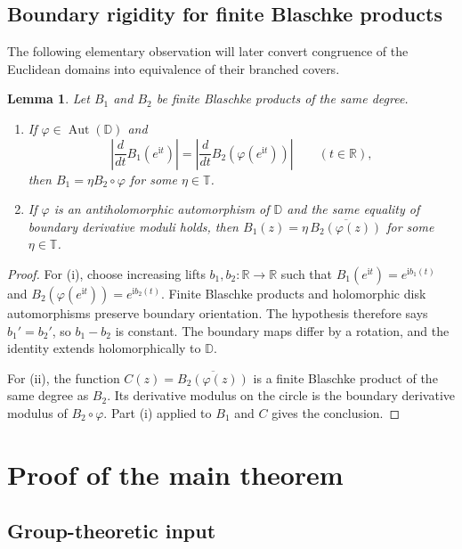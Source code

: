 \documentclass[11pt,letterpaper,reqno]{amsart}
\newtheorem{lemma}[lemma]{Lemma}
\theoremstyle{definition}
\newcommand{\D}{\mathbb D}
\newcommand{\T}{\mathbb T}
\newcommand{\R}{\mathbb R}
\newcommand{\Aut}{\operatorname{Aut}}
\newcommand{\iu}{\mathrm{i}}
\begin{document}
\subsection{Boundary rigidity for finite Blaschke products}

The following elementary observation will later convert congruence of
the Euclidean domains into equivalence of their branched covers.

\begin{lemma}
\label{lem:blaschke-boundary-rigidity}
Let $B_1$ and $B_2$ be finite Blaschke products of the same degree.
\begin{enumerate}[label=\textup{(\roman*)}]
\item If $\varphi\in\Aut(\D)$ and
\[
\left|\frac{d}{dt}B_1(e^{\iu t})\right|
=
\left|\frac{d}{dt}B_2(\varphi(e^{\iu t}))\right|
\qquad(t\in\R),
\]
then $B_1=\eta B_2\circ\varphi$ for some $\eta\in\T$.
\item If $\varphi$ is an antiholomorphic automorphism of $\D$ and the
same equality of boundary derivative moduli holds, then $B_1(z)=\eta\,\overline{B_2(\varphi(z))}$ for some $\eta\in\T$.
\end{enumerate}
\end{lemma}

\begin{proof}
For \textup{(i)}, choose increasing lifts $b_1,b_2:\R\to\R$ such that
$B_1(e^{\iu t})=e^{\iu b_1(t)}$ and
$B_2(\varphi(e^{\iu t}))=e^{\iu b_2(t)}$.
Finite Blaschke products and holomorphic disk automorphisms preserve
boundary orientation.  The hypothesis therefore says $b_1'=b_2'$,
so $b_1-b_2$ is constant.  The boundary maps differ by a rotation,
and the identity extends holomorphically to $\D$.

For \textup{(ii)}, the function $C(z)=\overline{B_2(\varphi(z))}$ is a finite Blaschke product of the same degree as $B_2$.  Its
derivative modulus on the circle is the boundary derivative modulus
of $B_2\circ\varphi$.  Part \textup{(i)} applied to $B_1$ and $C$
gives the conclusion.
\end{proof}



\section{Proof of the main theorem}
\label{sec:proof-main}

\subsection{Group-theoretic input}
\end{document}
